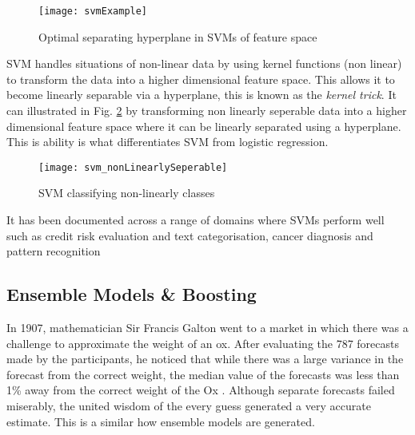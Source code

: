 \begin{figure}[H]
	\texttt{[image: svmExample]}
	\caption{Optimal separating hyperplane in SVMs of feature space \\
		\cite[Source:][]{li_adaptive_2011}
	}
	\label{fig:svmExample}
\end{figure}

SVM handles situations of non-linear data by using kernel functions (non linear) to transform the data into a higher dimensional feature space. This allows it to become linearly separable via a hyperplane, this is known as the \textit{kernel trick}. It can illustrated in Fig. \ref{fig:svm_nonLinearlySeperable} by transforming non linearly seperable data into a higher dimensional feature space where it can be linearly separated using a hyperplane. This is ability is what differentiates SVM from logistic regression.

\begin{figure}[H]
	\texttt{[image: svm\_nonLinearlySeperable]}
	\caption{SVM classifying non-linearly classes \\
		\cite[Source:][]{burges_tutorial_1998}
	}
	\label{fig:svm_nonLinearlySeperable}
\end{figure}

It has been documented across a range of domains where SVMs perform well such as credit risk evaluation \citep{van_gestel_credit_2009} and text categorisation, cancer diagnosis and pattern recognition \citep{shin_application_2005}

\subsection{Ensemble Models \& Boosting} \label{boosting}

In 1907, mathematician Sir Francis Galton went to a market in which there was a challenge
to approximate the weight of an ox. After evaluating the 787 forecasts made by the
participants, he noticed that while there was a large variance in the forecast from the correct weight, the median value of the
forecasts was less than 1\% away from the correct weight of the Ox \citep{galton_vox_1907}. Although separate forecasts failed miserably, the united wisdom of the every guess generated a very accurate estimate. This is a similar how ensemble models are generated.



